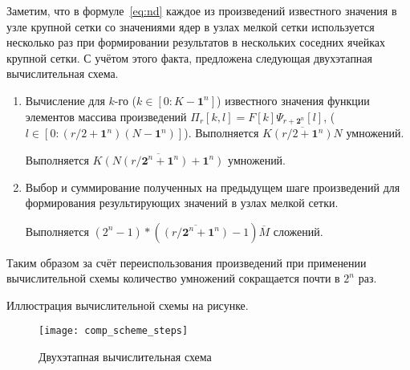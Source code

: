 Заметим, 
что в формуле~\eqref{eq:nd} каждое из произведений известного значения в узле крупной сетки
со значениями ядер в узлах мелкой сетки используется несколько раз
при формировании результатов в нескольких соседних
ячейках 
крупной сетки. 
С учётом этого факта,
предложена следующая двухэтапная вычислительная схема.
\begin{enumerate}
\item
  Вычисление для $k$-го ($k \in [0:K-\mathbf{1}^n]$)
  известного значения функции 
  элементов массива произведений
  $\Pi_r[k,l] = F[k]\Psi_{r+\mathbf{2}^n}[l]$,
($l \in [0:(r/2+\mathbf{1}^n)(N-\mathbf{1}^n)]$).
  Выполняется %
  $\overline{K(r/2+\mathbf{1}^n)N}$ умножений.

  Выполняется $\overline{K (N(r/\mathbf{2}^n + \mathbf{1}^n) +\mathbf{1}^n)}$ умножений.

\item
  Выбор и суммирование полученных на предыдущем шаге произведений
  для формирования результирующих значений в узлах мелкой сетки.
  

  Выполняется $(2^n-1) * (\overline{(r/\mathbf{2}^n+\mathbf{1}^n)} -1)  \overline{M}$ сложений.

\end{enumerate}

Таким образом за счёт переиспользования произведений при применении вычислительной схемы
количество умножений сокращается почти в  $2^n$ раз.




Иллюстрация вычислительной схемы на рисунке.
\begin{figure}[h!]
  \centering
  \texttt{[image: comp\_scheme\_steps]} 
  \caption{Двухэтапная вычислительная схема}
  \label{fig:reg_net}
\end{figure}
\FloatBarrier


